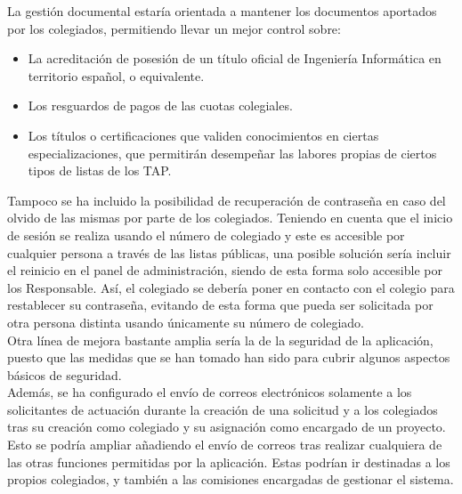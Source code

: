 La gestión documental estaría orientada a mantener los documentos aportados por los colegiados, permitiendo llevar un mejor control sobre:
\begin{itemize}
	\item La acreditación de posesión de un título oficial de Ingeniería Informática en territorio español, o equivalente.
	\item Los resguardos de pagos de las cuotas colegiales.
	\item Los títulos o certificaciones que validen conocimientos en ciertas especializaciones, que permitirán desempeñar las labores propias de ciertos tipos de listas de los TAP. \\
\end{itemize}

Tampoco se ha incluido la posibilidad de recuperación de contraseña en caso del olvido de las mismas por parte de los colegiados. Teniendo en cuenta que el inicio de sesión se realiza usando el número de colegiado y este es accesible por cualquier persona a través de las listas públicas, una posible solución sería incluir el reinicio en el panel de administración, siendo de esta forma solo accesible por los Responsable. Así, el colegiado se debería poner en contacto con el colegio para restablecer su contraseña, evitando de esta forma que pueda ser solicitada por otra persona distinta usando únicamente su número de colegiado. \\

Otra línea de mejora bastante amplia sería la de la seguridad de la aplicación, puesto que las medidas que se han tomado han sido para cubrir algunos aspectos básicos de seguridad. \\

Además, se ha configurado el envío de correos electrónicos solamente a los solicitantes de actuación durante la creación de una solicitud y a los colegiados tras su creación como colegiado y su asignación como encargado de un proyecto. Esto se podría ampliar añadiendo el envío de correos tras realizar cualquiera de las otras funciones permitidas por la aplicación. Estas podrían ir destinadas a los propios colegiados, y también a las comisiones encargadas de gestionar el sistema. \\

